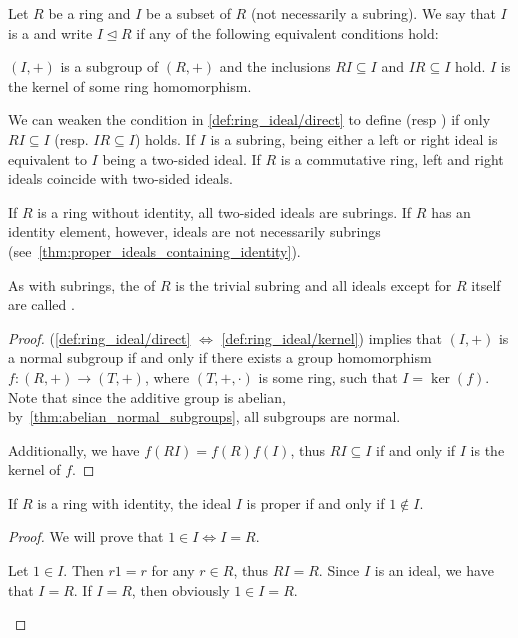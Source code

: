 \begin{definition}\label{def:ring_ideal}
  Let \( R \) be a ring and \( I \) be a subset of \( R \) (not necessarily a subring). We say that \( I \) is a  and write \( I \unlhd R \) if any of the following equivalent conditions hold:
  \begin{defenum}
     \( (I, +) \) is a subgroup of \( (R, +) \) and the inclusions \( RI \subseteq I \) and \( IR \subseteq I \) hold.
     \( I \) is the kernel of some ring homomorphism.
  \end{defenum}

  We can weaken the condition in \ref{def:ring_ideal/direct} to define  (resp ) if only \( RI \subseteq I \) (resp. \( IR \subseteq I \)) holds. If \( I \) is a subring, being either a left or right ideal is equivalent to \( I \) being a two-sided ideal. If \( R \) is a commutative ring, left and right ideals coincide with two-sided ideals.

  If \( R \) is a ring without identity, all two-sided ideals are subrings. If \( R \) has an identity element, however, ideals are not necessarily subrings (see~\cref{thm:proper_ideals_containing_identity}).

  As with subrings, the  of \( R \) is the trivial subring and all ideals except for \( R \) itself are called .
\end{definition}
\begin{proof}
  (\ref{def:ring_ideal/direct} \( \iff \) \ref{def:ring_ideal/kernel})  implies that \( (I, +) \) is a normal subgroup if and only if there exists a group homomorphism \( f: (R, +) \to (T, +) \), where \( (T, +, \cdot) \) is some ring, such that \( I = \ker(f) \). Note that since the additive group is abelian, by~\cref{thm:abelian_normal_subgroups}, all subgroups are normal.

  Additionally, we have \( f(RI) = f(R)f(I) \), thus \( RI \subseteq I \) if and only if \( I \) is the kernel of \( f \).
\end{proof}

\begin{proposition}\label{thm:proper_ideals_containing_identity}
  If \( R \) is a ring with identity, the ideal \( I \) is proper if and only if \( 1 \not\in I \).
\end{proposition}
\begin{proof}
  We will prove that \( 1 \in I \iff I = R \).

  \begin{description}
    \Implies Let \( 1 \in I \). Then \( r1 = r \) for any \( r \in R \), thus \( RI = R \). Since \( I \) is an ideal, we have that \( I = R \).
    \ImpliedBy If \( I = R \), then obviously \( 1 \in I = R \).
  \end{description}
\end{proof}

